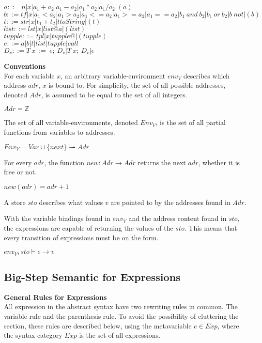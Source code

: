 $a ::= n | x | a_1+a_2 | a_1-a_2 | a_1*a_2 | a_1/a_2 | (a)$\\
$b ::= tf| x | a_1<a_2 | a_1>a_2 | a_1<=a_2| a_1>=a_2| a_1==a_2 | b_1\ and\ b_2 | b_1\ or\ b_2 | b\ not | (b)$\\
$t ::= str| x | t_1 + t_2 | t toString | (t)$\\
$list ::= lst | x | list @ a | (list)$\\
$tupple ::= tpl | x | tupple @ | (tupple)$\\
$e ::= a | b | t | list | tupple | call$\\
$D_v ::= T\ x\ :=\ e;\ D_v | T\ x;\ D_v | \epsilon$

\textbf{\large{Conventions}} \\
For each variable $x$, an arbitrary variable-environment $env_V$ describes which address $adr$, $x$ is bound to.
For simplicity, the set of all possible addresses, denoted $Adr$, is assumed to be equal to the set of all integers.
\begin{center}
	$Adr = \mathbb{Z}$
\end{center}
The set of all variable-environments, denoted \textbf{$Env_V$}, is the set of all partial functions from variables to addresses.
\begin{center}
	$Env_V = Var \cup \{next\} \rightharpoonup Adr$
\end{center}
For every $adr$, the function $new : Adr \rightarrow Adr$ returns the next $adr$, whether it is free or not.
\begin{center}
	$new (adr) = adr + 1$
\end{center}
A store $sto$ describes what values $v$ are pointed to by the addresses found in $Adr$.

With the variable bindings found in $env_V$ and the address content found in $sto$, the expressions are capable of returning the values of the $sto$.
This means that every transition of expressions must be on the form.
\begin{center}
	$env_V,sto \vdash e \rightarrow v$
\end{center} 

\subsection{Big-Step Semantic for Expressions}

\textbf{\large{General Rules for Expressions}} \\
All expression in the abstract syntax have two rewriting rules in common.
The variable rule and the parenthesis rule.
To avoid the possibility of cluttering the section, these rules are described below, using the metavariable $e \in Exp$, where the syntax category $Exp$ is the set of all expressions.

